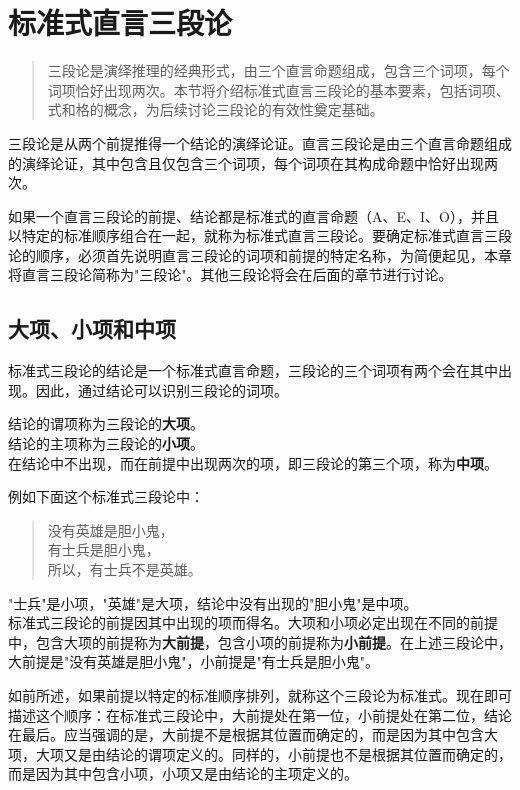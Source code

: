 \section{标准式直言三段论}

\begin{quotation}
三段论是演绎推理的经典形式，由三个直言命题组成，包含三个词项，每个词项恰好出现两次。本节将介绍标准式直言三段论的基本要素，包括词项、式和格的概念，为后续讨论三段论的有效性奠定基础。
\end{quotation}

三段论是从两个前提推得一个结论的演绎论证。直言三段论是由三个直言命题组成的演绎论证，其中包含且仅包含三个词项，每个词项在其构成命题中恰好出现两次。

如果一个直言三段论的前提、结论都是标准式的直言命题（A、E、I、O），并且以特定的标准顺序组合在一起，就称为标准式直言三段论。要确定标准式直言三段论的顺序，必须首先说明直言三段论的词项和前提的特定名称，为简便起见，本章将直言三段论简称为"三段论"。其他三段论将会在后面的章节进行讨论。

\subsection{大项、小项和中项}
标准式三段论的结论是一个标准式直言命题，三段论的三个词项有两个会在其中出现。因此，通过结论可以识别三段论的词项。

结论的谓项称为三段论的\textbf{大项}。\\
结论的主项称为三段论的\textbf{小项}。\\
在结论中不出现，而在前提中出现两次的项，即三段论的第三个项，称为\textbf{中项}。

例如下面这个标准式三段论中：

\begin{quote}
没有英雄是胆小鬼，\\
有士兵是胆小鬼，\\
所以，有士兵不是英雄。
\end{quote}

"士兵"是小项，"英雄"是大项，结论中没有出现的"胆小鬼"是中项。\\
标准式三段论的前提因其中出现的项而得名。大项和小项必定出现在不同的前提中，包含大项的前提称为\textbf{大前提}，包含小项的前提称为\textbf{小前提}。在上述三段论中，大前提是"没有英雄是胆小鬼"，小前提是"有士兵是胆小鬼"。

如前所述，如果前提以特定的标准顺序排列，就称这个三段论为标准式。现在即可描述这个顺序：在标准式三段论中，大前提处在第一位，小前提处在第二位，结论在最后。应当强调的是，大前提不是根据其位置而确定的，而是因为其中包含大项，大项又是由结论的谓项定义的。同样的，小前提也不是根据其位置而确定的，而是因为其中包含小项，小项又是由结论的主项定义的。

